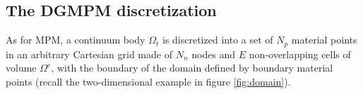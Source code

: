 



\subsection{The DGMPM discretization}
As for MPM, a continuum body $\Omega_t$ is discretized into a set of $N_p$ material points in an arbitrary Cartesian grid made of  $N_n$ nodes and $E$ non-overlapping cells of volume $\Omega^e$, with the boundary of the domain defined by boundary material points (recall the two-dimensional example in figure \ref{fig:domain}).

